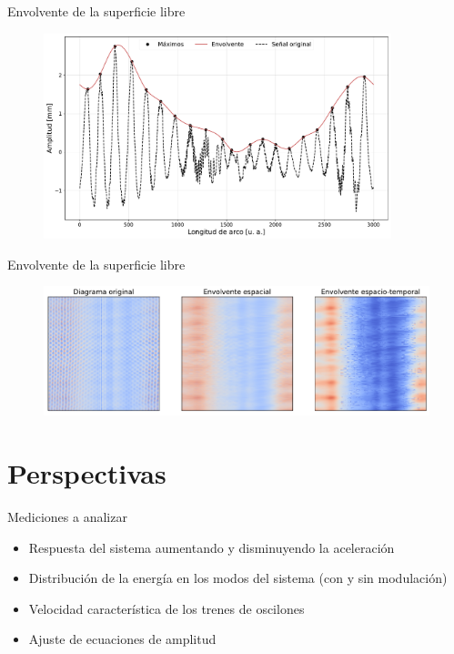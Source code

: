 \documentclass[aspectratio=169]{beamer}
\begin{document}
\begin{frame}{Envolvente de la superficie libre} %
	\begin{figure}[ht]
		\includegraphics[width=0.9\textwidth]{figs/env_1sample.pdf}
	\end{figure}
\end{frame}

\begin{frame}{Envolvente de la superficie libre}
	\begin{figure}[ht]
		\centering
		\includegraphics[width=\textwidth]{figs/st_envelopes.pdf}
	\end{figure}
\end{frame}

\section{Perspectivas}
\begin{frame}{Mediciones a analizar}
	\begin{itemize} 
		\item Respuesta del sistema aumentando y disminuyendo la aceleración
			\vspace{0.8cm}
		\item Distribución de la energía en los modos del sistema (con y sin modulación)
			\vspace{0.8cm}
		\item Velocidad característica de los trenes de oscilones
			\vspace{0.8cm}
		\item Ajuste de ecuaciones de amplitud
	\end{itemize}
\end{frame}
\end{document}
